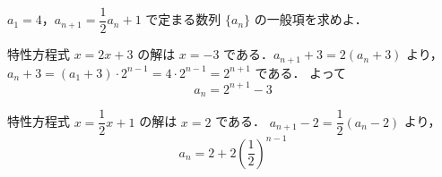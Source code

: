 \documentclass[lualatex,paper=b5j,fontsize=10pt,twoside]{jlreq}
\begin{document}
\begin{mmproblem}[1.2]{}
$a_1=4$，$a_{n+1}=\dfrac{1}{2}a_n+1$ で定まる数列 $\{a_n\}$ の一般項を求めよ．
\end{mmproblem}


\begin{mmproblems}
  \item 特性方程式 $x=2x+3$ の解は $x=-3$ である．$a_{n+1}+3=2(a_n+3)$
    より，$a_n+3=(a_1+3)\cdot 2^{n-1}=4\cdot 2^{n-1}=2^{n+1}$ である．
    よって
    \[
      a_n=2^{n+1}-3
    \]
  \item 特性方程式 $x=\dfrac{1}{2}x+1$ の解は $x=2$ である．
    $a_{n+1}-2=\dfrac{1}{2}(a_n-2)$ より，
    \[
      a_n=2+2\left(\dfrac{1}{2}\right)^{n-1}
    \]
\end{mmproblems}
\end{document}
